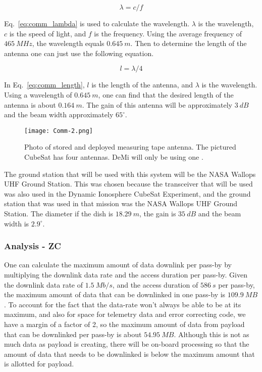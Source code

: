 \documentclass[12pt]{article}
\begin{document}
\begin{equation}\label{eq:comm_lambda}
\lambda = c/f
\end{equation}

Eq.~\ref{eq:comm_lambda} is used to calculate the wavelength. $\lambda$ is the wavelength, $c$ is the speed of light, and $f$ is the frequency. Using the average frequency of $465\ MHz$, the wavelength equals $0.645\ m$. Then to determine the length of the antenna one can just use the following equation.

\begin{equation}\label{eq:comm_length}
l = \lambda/4
\end{equation}

In Eq.~\ref{eq:comm_length}, $l$ is the length of the antenna, and $\lambda$ is the wavelength. Using a wavelength of $0.645\ m$, one can find that the desired length of the antenna is about $0.164\ m$. The gain of this antenna will be approximately $3\ dB$ and the beam width approximately $65^\circ$.

\begin{figure}[ht]
\centering
  \texttt{[image: Comm-2.png]}
\caption{Photo of stored and deployed measuring tape antenna. The pictured CubeSat has four antennas. DeMi will only be using one \cite{antenna}.}
\label{fig:comm_tape}
\end{figure}

The ground station that will be used with this system will be the NASA Wallops UHF Ground Station. This was chosen because the transceiver that will be used was also used in the Dynamic Ionosphere CubeSat Experiment, and the ground station that was used in that mission was the NASA Wallops UHF Ground Station. The diameter if the dish is $18.29\ m$, the gain is $35\ dB$ and the beam width is $2.9^\circ$.

			\subsubsection{Analysis - ZC}

One can calculate the maximum amount of data downlink per pass-by by multiplying the downlink data rate and the access duration per pass-by. Given the downlink data rate of $1.5\ Mb/s$, and the access duration of $586\ s$ per pass-by, the maximum amount of data that can be downlinked in one pass-by is $109.9\ MB$. To account for the fact that the data-rate won’t always be able to be at its maximum, and also for space for telemetry data and error correcting code, we have a margin of a factor of 2, so the maximum amount of data from payload that can be downlinked per pass-by is about $54.95\ MB$. Although this is not as much data as payload is creating, there will be on-board processing so that the amount of data that needs to be downlinked is below the maximum amount that is allotted for payload.
\end{document}
